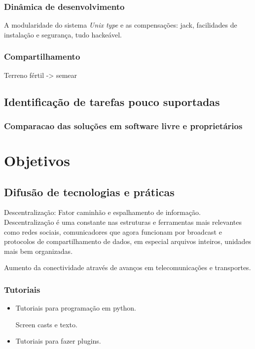 \subsubsection{Dinâmica de desenvolvimento}
\label{sec:din_dev}

A modularidade do sistema \emph{Unix type} e as compensações: jack,
facilidades de instalação e segurança, tudo hackeável.

\subsubsection{Compartilhamento}
\label{sec:comp_tec}

Terreno fértil -> semear

\subsection{Identificação de tarefas pouco suportadas}
\label{sec:tarefas_n_sup}

\subsubsection{Comparacao das soluções em software livre e proprietários}
\label{sec:sl_prop}


\section{Objetivos}
\label{sec:objetivos}


\subsection{Difusão de tecnologias e práticas}
\label{sec:tutoriais}

Descentralização: Fator caminhão e espalhamento de informação. Descentralização
é uma constante nas estruturas e ferramentas mais relevantes como redes
sociais, comunicadores que agora funcionam por broadcast e protocolos de
compartilhamento de dados, em especial arquivos inteiros, unidades mais
bem organizadas.

Aumento da conectividade através de avanços em telecomunicações e transportes.

\subsubsection{Tutoriais}
\label{sec:uso_sl}

\begin{itemize}
    \item Tutoriais para programação em python.

Screen casts e texto.

    \item Tutoriais para fazer plugins.
\end{itemize}

